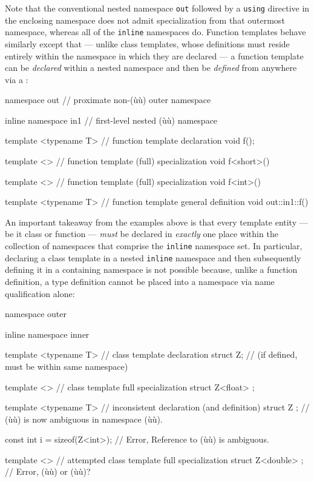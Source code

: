 \noindent Note that the conventional nested namespace \lstinline!out! followed by a
\lstinline!using! directive in the enclosing namespace does not admit
specialization from that outermost namespace, whereas all of the
\lstinline!inline! namespaces do. Function templates behave similarly
except that --- unlike class templates, whose definitions must reside
entirely within the namespace in which they are declared --- a function
template can be \emph{declared} within a nested namespace and then be
\emph{defined} from anywhere via a :

\begin{emcppslisting}
namespace out                      // proximate non-(ù{}ù) outer namespace
{
    inline namespace in1           // first-level nested (ù{}ù) namespace
    {
        template <typename T>      // function template declaration
        void f();

        template <>                // function template (full) specialization
        void f<short>() { }
    }

    template <>                    // function template (full) specialization
    void f<int>() { }
}

template <typename T>              // function template general definition
void out::in1::f() { }
\end{emcppslisting}

\noindent An important takeaway from the examples above is that every template
entity --- be it class or function --- \emph{must} be declared
in \emph{exactly} one place within the collection of namespaces that
comprise the \lstinline!inline! namespace set. In particular, declaring a
class template in a nested \lstinline!inline! namespace and then
subsequently defining it in a containing namespace is not possible
because, unlike a function definition, a type definition cannot be
placed into a namespace via name qualification alone:

\begin{emcppslisting}[emcppserrorlines={17}]
namespace outer
{
    inline namespace inner
    {
        template <typename T>      // class template declaration
        struct Z;                  // (if defined, must be within same namespace)

        template <>                // class template full specialization
        struct Z<float> { };
    }

    template <typename T>          // inconsistent declaration (and definition)
    struct Z { };                  // (ù{}ù) is now ambiguous in namespace (ù{}ù).

    const int i = sizeof(Z<int>);  // Error, Reference to (ù{}ù) is ambiguous.

    template <>                    // attempted class template full specialization
    struct Z<double> { };          // Error, (ù{}ù) or (ù{}ù)?
}
\end{emcppslisting}


